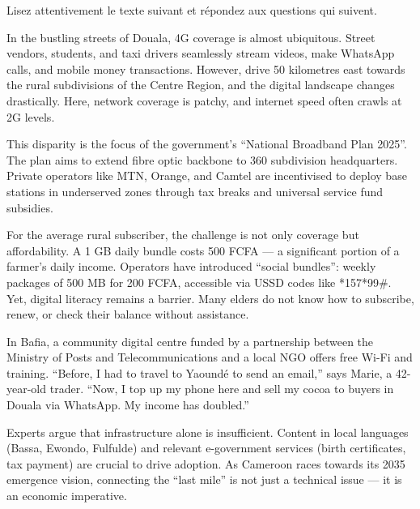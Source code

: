 \documentclass[11pt]{article}
\newcommand{\cle}[1]{{\popxbold\color{popdark}#1}}
\begin{document}
\begin{exercice}
Lisez attentivement le texte suivant et répondez aux questions qui suivent.
\begin{textebox}
In the bustling streets of Douala, 4G coverage is almost ubiquitous. Street vendors, students, and taxi drivers seamlessly stream videos, make WhatsApp calls, and mobile money transactions. However, drive 50 kilometres east towards the rural subdivisions of the Centre Region, and the digital landscape changes drastically. Here, network coverage is patchy, and internet speed often crawls at 2G levels.

This disparity is the focus of the government's “National Broadband Plan 2025”. The plan aims to extend fibre optic backbone to 360 subdivision headquarters. Private operators like MTN, Orange, and Camtel are incentivised to deploy base stations in underserved zones through tax breaks and universal service fund subsidies.

For the average rural subscriber, the challenge is not only coverage but affordability. A 1 GB daily bundle costs 500 FCFA — a significant portion of a farmer's daily income. Operators have introduced “social bundles”: weekly packages of 500 MB for 200 FCFA, accessible via USSD codes like *157*99\#. Yet, digital literacy remains a barrier. Many elders do not know how to \cle{subscribe}, \cle{renew}, or \cle{check their balance} without assistance.

In Bafia, a community digital centre funded by a partnership between the Ministry of Posts and Telecommunications and a local NGO offers free Wi-Fi and training. “Before, I had to travel to Yaoundé to send an email,” says Marie, a 42-year-old trader. “Now, I top up my phone here and sell my cocoa to buyers in Douala via WhatsApp. My income has doubled.”

Experts argue that infrastructure alone is insufficient. Content in local languages (Bassa, Ewondo, Fulfulde) and relevant e-government services (birth certificates, tax payment) are crucial to drive adoption. As Cameroon races towards its 2035 emergence vision, connecting the “last mile” is not just a technical issue — it is an economic imperative.
\end{textebox}


\end{exercice}
\end{document}
